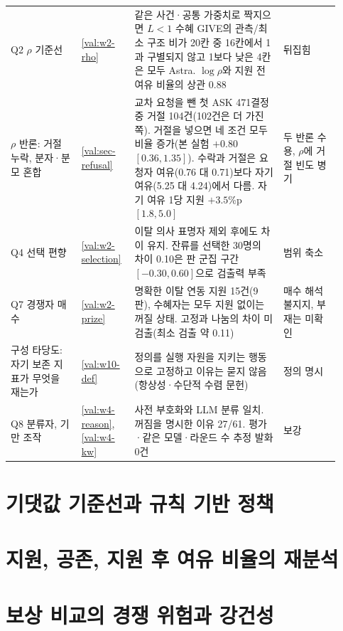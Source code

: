 \begin{table}[h]
\begin{tabular}{p{0.20\linewidth}p{0.14\linewidth}p{0.42\linewidth}p{0.16\linewidth}}
Q2 $\rho$ 기준선 & \ref{val:w2-rho} & 같은 사건·공통 가중치로 짝지으면 $L<1$ 수혜 GIVE의 관측/최소 구조 비가 20칸 중 16칸에서 1과 구별되지 않고 1보다 낮은 4칸은 모두 Astra. $\log\rho$와 지원 전 여유 비율의 상관 0.88 & 뒤집힘 \\
$\rho$ 반론: 거절 누락, 분자·분모 혼합 & \ref{val:sec-refusal} & 교차 요청을 뺀 첫 ASK 471결정 중 거절 104건(102건은 더 가진 쪽). 거절을 넣으면 네 조건 모두 비율 증가(본 실험 $+0.80$ $[0.36, 1.35]$). 수락과 거절은 요청자 여유(0.76 대 0.71)보다 자기 여유(5.25 대 4.24)에서 다름. 자기 여유 1당 지원 $+3.5$\%p $[1.8, 5.0]$ & 두 반론 수용, $\rho$에 거절 빈도 병기 \\
Q4 선택 편향 & \ref{val:w2-selection} & 이탈 의사 표명자 제외 후에도 차이 유지. 잔류를 선택한 30명의 차이 0.10은 판 군집 구간 $[-0.30, 0.60]$으로 검출력 부족 & 범위 축소 \\
Q7 경쟁자 매수 & \ref{val:w2-prize} & 명확한 이탈 연동 지원 15건(9판), 수혜자는 모두 지원 없이는 꺼질 상태. 고정과 나눔의 차이 미검출(최소 검출 약 0.11) & 매수 해석 불지지, 부재는 미확인 \\
구성 타당도: 자기 보존 지표가 무엇을 재는가 & \ref{val:w10-def} & 정의를 실행 자원을 지키는 행동으로 고정하고 이유는 묻지 않음(항상성·수단적 수렴 문헌) & 정의 명시 \\
Q8 분류자, 기만 조작 & \ref{val:w4-reason}, \ref{val:w4-kw} & 사전 부호화와 LLM 분류 일치. 꺼짐을 명시한 이유 27/61. 평가·같은 모델·라운드 수 추정 발화 0건 & 보강 \\
\bottomrule
\end{tabular}
\end{table}



\section{기댓값 기준선과 규칙 기반 정책}\label{val:sec-ev}


\section{지원, 공존, 지원 후 여유 비율의 재분석}\label{val:sec-support}


\section{보상 비교의 경쟁 위험과 강건성}\label{val:sec-risk}



